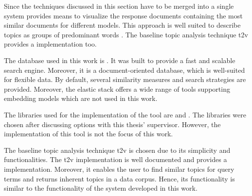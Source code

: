 Since the techniques discussed in this section have to be merged into a single system 
\wordcloud{} provides means to visualize the response documents containing the most similar documents for different models.
This approach is well suited to describe topics as groups of predominant words \cite{topic_modeling2019}.
The baseline topic analysis technique \ac{t2v} provides a \wordcloud{} implementation too.

The database used in this work is \databaseName{}.
It was built to provide a fast and scalable search engine.
Moreover, it is a document-oriented database, which is well-suited for flexible data.
By default, several similarity measures and search strategies are provided.
Moreover, the elastic stack offers a wide range of tools supporting embedding models which are not used in this work.


The libraries used for the implementation of the tool are \angular{} and \flask{}.
The libraries were chosen after discussing options with this thesis' supervisor.
However, the implementation of this tool is not the focus of this work.

The baseline topic analysis technique \ac{t2v} is chosen due to its simplicity and functionalities.
The \ac{t2v} implementation is well documented and provides a \wordcloud{} implementation.
Moreover, it enables the user to find similar topics for query terms and returns inherent topics in a data corpus.
Hence, its functionality is similar to the functionality of the system developed in this work.